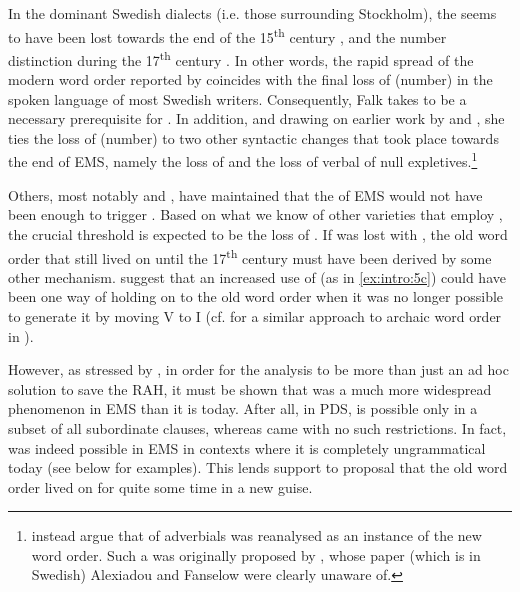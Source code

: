 \documentclass[output=paper]{langscibook}
\begin{document}
In the dominant Swedish dialects (i.e. those surrounding Stockholm), the  seems to have been lost towards the end of the 15\textsuperscript{th} century \citep{Neuman1925}, and the number distinction during the 17\textsuperscript{th} century \citep{Larsson1988}. In other words, the rapid spread of the modern word order reported by \citet{Falk1993} coincides with the final loss of (number)  in the spoken language of most Swedish writers. Consequently, Falk takes  to be a necessary prerequisite for  . In addition, and drawing on earlier work by \citet{Platzack1985} and \citet{PlatzackHolmberg1989}, she ties the loss of (number)  to two other syntactic changes that took place towards the end of EMS, namely the loss of  and the loss of verbal  of null expletives.\footnote{\citet{AlexiadouFanselow2002} instead argue that  of adverbials was reanalysed as an instance of the new word order. Such a  was originally proposed by \citet{Pettersson1988}, whose paper (which is in Swedish) Alexiadou and Fanselow were clearly unaware of.} 



Others, most notably \citet{Rohrbacher1999} and \citet{KoenemanZeijlstra2014}, have maintained that the  of EMS would not have been enough to trigger . Based on what we know of other varieties that employ , the crucial threshold is expected to be the loss of . If  was lost with , the old word order that still lived on until the 17\textsuperscript{th} century must have been derived by some other mechanism. \citet{KoenemanZeijlstra2014} suggest that an increased use of  (as in \ref{ex:intro:5c}) could have been one way of holding on to the old word order when it was no longer possible to generate it by moving V to I (cf. \citealt{HeycockEtAl2010} for a similar approach to archaic word order in ).



However, as stressed by \citet{Gartner2019}, in order for the  analysis to be more than just an ad hoc solution to save the RAH, it must be shown that  was a much more widespread phenomenon in EMS than it is today. After all, in PDS,  is possible only in a subset of all subordinate clauses, whereas  came with no such restrictions. In fact,  was indeed possible in EMS in contexts where it is completely ungrammatical today (see  below for examples). This lends support to  proposal that the old word order lived on for quite some time in a new guise.
\end{document}

